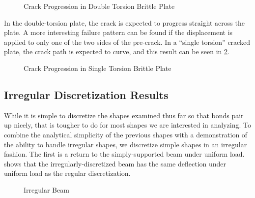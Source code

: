 %
\begin{figure}[tbhp]
  \centering
  \resizebox{0.8\linewidth}{!}{}
  \caption{Crack Progression in Double Torsion Brittle Plate}
  \label{fig:DTdamage}
\end{figure}
%
In the double-torsion plate, the crack is expected to progress straight across the plate.
A more interesting failure pattern can be found if the displacement is applied to only one of the two sides of the pre-crack.
In a ``single torsion'' cracked plate, the crack path is expected to curve, and this result can be seen in \cref{fig:SingleTorsion}.
%
\begin{figure}[tbhp]
  \centering
  \resizebox{0.8\linewidth}{!}{}
  \caption{Crack Progression in Single Torsion Brittle Plate}
  \label{fig:SingleTorsion}
\end{figure}
%

\FloatBarrier
\subsection{Irregular Discretization Results}
While it is simple to discretize the shapes examined thus far so that bonds pair up nicely, that is tougher to do for most shapes we are interested in analyzing.
To combine the analytical simplicity of the previous shapes with a demonstration of the ability to handle irregular shapes, we discretize simple shapes in an irregular fashion.
The first is a return to the simply-supported beam under uniform load.
 shows that the irregularly-discretized beam has the same deflection under uniform load as the regular discretization.
%
\begin{figure}[tbhp]
  \centering
  \resizebox{0.6\linewidth}{!}{}
  \caption{Irregular Beam}
  \label{fig:BeamIrreg}
\end{figure}
%

